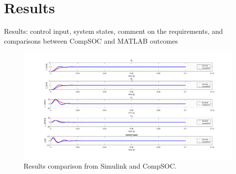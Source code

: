 \section{Results}


\color{red}
Results:	control	input,	system	states,	comment	on	the	requirements,	and	comparisons	
between	CompSOC and	MATLAB	outcomes
\color{black}


\begin{figure}[h]
	\begin{center}
		\includegraphics[width=\linewidth]{img/p400}
		\caption{Results comparison from Simulink and CompSOC.}
		\label{fig:p400}
	\end{center}
\end{figure}
